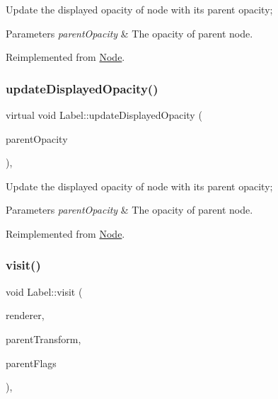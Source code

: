 Update the displayed opacity of node with it\textquotesingle{}s parent opacity; 
\begin{DoxyParams}{Parameters}
{\em parent\+Opacity} & The opacity of parent node. \\
\hline
\end{DoxyParams}


Reimplemented from \hyperlink{classNode_a3a0122884e7e1ce310b8b68abfbb245b}{Node}.

\mbox{\label{classLabel_a89d48e49df588b91d259cac6f8732162}} 
\subsubsection{\texorpdfstring{update\+Displayed\+Opacity()}{updateDisplayedOpacity()}\hspace{0.1cm}{\footnotesize\ttfamily [2/2]}}
{\footnotesize\ttfamily virtual void Label\+::update\+Displayed\+Opacity (\begin{DoxyParamCaption}\item[{G\+Lubyte}]{parent\+Opacity }\end{DoxyParamCaption})\hspace{0.3cm}{\ttfamily [override]}, {\ttfamily [virtual]}}

Update the displayed opacity of node with it\textquotesingle{}s parent opacity; 
\begin{DoxyParams}{Parameters}
{\em parent\+Opacity} & The opacity of parent node. \\
\hline
\end{DoxyParams}


Reimplemented from \hyperlink{classNode_a3a0122884e7e1ce310b8b68abfbb245b}{Node}.

\mbox{\label{classLabel_ae8e300dcf7e2a6b98e2ae39632d290c8}} 
\subsubsection{\texorpdfstring{visit()}{visit()}\hspace{0.1cm}{\footnotesize\ttfamily [1/2]}}
{\footnotesize\ttfamily void Label\+::visit (\begin{DoxyParamCaption}\item[{\hyperlink{classRenderer}{Renderer} $\ast$}]{renderer,  }\item[{const \hyperlink{classMat4}{Mat4} \&}]{parent\+Transform,  }\item[{uint32\+\_\+t}]{parent\+Flags }\end{DoxyParamCaption})\hspace{0.3cm}{\ttfamily [override]}, {\ttfamily [virtual]}}

